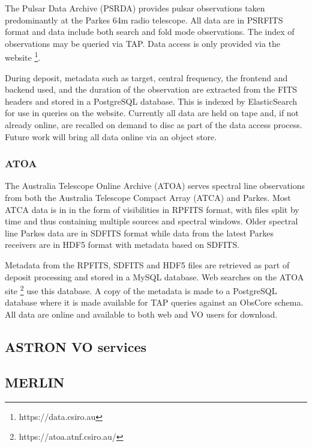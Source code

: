 \documentclass[11pt,a4paper]{ivoa}
\begin{document}
The Pulsar Data Archive (PSRDA) provides pulsar observations taken predominantly at the Parkes 64m radio telescope.
All data are in PSRFITS format and data include both search and fold mode observations.
The index of observations may be queried via TAP. Data access is only provided via the website \footnote{https://data.csiro.au}.

During deposit, metadata such as target, central frequency, the frontend and backend used, and the duration of the observation are extracted from the FITS headers and stored in a PostgreSQL database.
This is indexed by ElasticSearch for use in queries on the website.
Currently all data are held on tape and, if not already online, are recalled on demand to disc as part of the data access process.
Future work will bring all data online via an object store.

\subsubsection{ATOA}

The Australia Telescope Online Archive (ATOA) serves spectral line observations from both the Australia Telescope Compact Array (ATCA) and Parkes.
Most ATCA data is in in the form of visibilities in RPFITS format, with files split by time and thus containing multiple sources and spectral windows.
Older spectral line Parkes data are in SDFITS format while data from the latest Parkes receivers are in HDF5 format with metadata based on SDFITS.

Metadata from the RPFITS, SDFITS and HDF5 files are retrieved as part of deposit processing and stored in a MySQL database. Web searches on the ATOA site \footnote{https://atoa.atnf.csiro.au/} use this database.
A copy of the metadata is made to a PostgreSQL database where it is made available for TAP queries against an ObsCore schema. 
All data are online and available to both web and VO users for download.

\subsection{ASTRON VO services}\label{sec:Astron}

\subsection{MERLIN}\label{sec:MERLIN}

\end{document}
